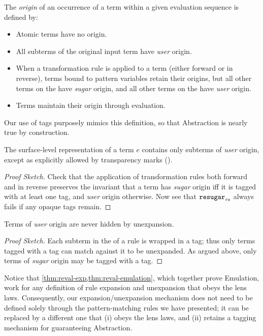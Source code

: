 \begin{definition}
\label{def:reval-origin}
The \emph{origin} of an occurrence of a term within a given evaluation
sequence is defined by:
\begin{itemize}
\item Atomic terms have no origin.
\item All subterms of the original input term have \emph{user} origin.
\item When a transformation rule is applied to a term (either forward or
  in reverse), terms bound to pattern variables retain their origins, but
  all other terms on the  have \emph{sugar} origin, and
  all other terms on the  have \emph{user} origin.
\item Terms maintain their origin through evaluation.
\end{itemize}
\end{definition}

Our use of {\MacBodyf} tags purposely mimics this definition, so that
Abstraction is nearly true by construction.

\begin{theorem}[Abstraction 1]
\label{thm:reval-abstraction}
The surface-level representation of a term $e$ contains only subterms of
\emph{user} origin, except as explicitly allowed by transparency marks
(\Code{!}).
\end{theorem}
\begin{proof}[Proof Sketch]
Check that the application of transformation rules both forward and in
reverse preserves the invariant that a term has \emph{sugar} origin iff it
is tagged with at least one {\MacBodyf} tag, and \emph{user} origin
otherwise. Now see that $\textnormal{\texttt{resugar}}_{\mathit{rs}}$ always fails if any opaque
{\MacBodyf} tags remain.
\end{proof}
\begin{theorem}[Abstraction 2]
Terms of \emph{user} origin are never hidden by unexpansion.
\end{theorem}
\begin{proof}[Proof Sketch]
Each subterm in the  of a rule is wrapped in a {\MacBodyf} tag; thus
only terms tagged with a {\MacBodyf} tag can match against it to be
unexpanded. As argued above, only terms of \emph{sugar} origin may be
tagged with a {\MacBodyf} tag.
\end{proof}

Notice that \cref{thm:reval-exp,thm:reval-emulation}, which together prove
Emulation, work for any definition of rule expansion and unexpansion that
obeys the lens laws. Consequently, our expansion/unexpansion mechanism
does not need to be defined solely through the pattern-matching rules
we have presented; it can be replaced by a different one that
(i) obeys the lens
laws, and (ii) retains a tagging mechanism for guaranteeing Abstraction.


